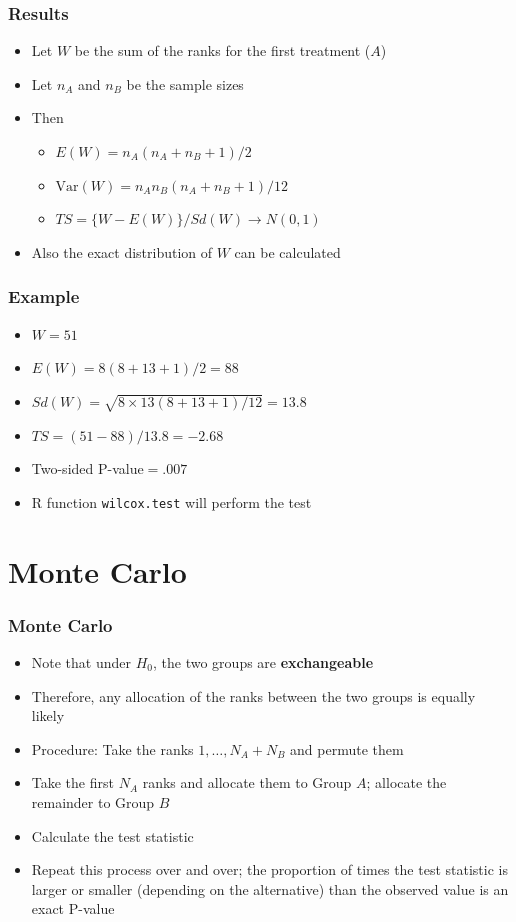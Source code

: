 \documentclass[aspectratio=169]{beamer}
\newcommand{\Var}{\mathrm{Var}}
\begin{document}
\begin{frame}\frametitle{Results} 
\begin{itemize}
\item  Let $W$ be the sum of the ranks for the first treatment ($A$)
\item Let $n_A$ and $n_B$ be the sample sizes 
\item Then
\begin{itemize}
\item $E(W) = n_A ( n_A + n_B + 1)/ 2$
\item $\Var(W) = n_A n_B (n_A + n_B + 1) / 12$
\item $TS = \{W - E(W)\}/Sd(W) \rightarrow N(0,1)$
\end{itemize}
\item Also the exact distribution of $W$ can be calculated
\end{itemize}
\end{frame}

\begin{frame}\frametitle{Example}
\begin{itemize}
\item $W = 51$
\item $E(W) = 8 (8 + 13 + 1) / 2 = 88$
\item $Sd(W) = \sqrt{8 \times 13 (8 + 13 + 1) / 12} = 13.8$
\item $TS = (51 - 88) / 13.8 = -2.68$
\item Two-sided P-value$ = .007$
\item R function \texttt{wilcox.test} will perform the test
\end{itemize}
\end{frame}

\section{Monte Carlo}
\begin{frame}\frametitle{Monte Carlo}
\begin{itemize}
\item Note that under $H_0$, the two groups are {\bf exchangeable}
\item Therefore, any allocation of the ranks between the two groups is
  equally likely
\item Procedure: Take the ranks $1,\ldots,N_A+N_B$ and permute them
\item Take the first $N_A$ ranks and allocate them to Group $A$;
  allocate the remainder to Group $B$
\item Calculate the test statistic
\item Repeat this process over and over; the proportion of times the
  test statistic is larger or smaller (depending on the alternative) than
  the observed value is an exact P-value
\end{itemize}
\end{frame}
\end{document}
